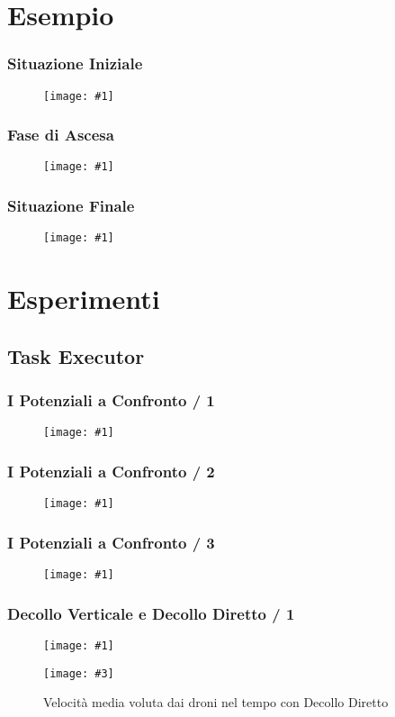 \documentclass{beamer}
\newcommand{\putimage}[2] {
  \begin{figure}[H]
    \centering
    \texttt{[image: \#1]}
	\end{figure}
}
\newcommand{\putimagecouple}[4] {
  \begin{figure}[!htb]
    \centering
    \begin{minipage}{0.45\linewidth}
      \centering
      \texttt{[image: \#1]}
      \caption{#2}
    \end{minipage}
    \hspace{0.25cm}
    \begin{minipage}{0.45\linewidth}
      \centering
      \texttt{[image: \#3]}
      \caption{#4}
    \end{minipage}
  \end{figure}
}
\begin{document}
\section{Esempio}

\begin{frame}
\frametitle{Situazione Iniziale}
\putimage{images/esempio/iterazione\_zero\_left.png}{0.85}
\end{frame}

\begin{frame}
\frametitle{Fase di Ascesa}
\putimage{images/esempio/iterazione\_venti\_left.png}{0.85}
\end{frame}

\begin{frame}
\frametitle{Situazione Finale}
\putimage{images/esempio/iterazione\_finale\_top.png}{0.85}
\end{frame}

\section{Esperimenti}

\subsection{Task Executor}

\begin{frame}
\frametitle{I Potenziali a Confronto / 1}
  \putimage{images/slides/task-executor-noiseless-vertical/MeanDistanceFromTarget.png}{0.66}
\end{frame}

\begin{frame}
\frametitle{I Potenziali a Confronto / 2}
\putimage{images/slides/task-executor-noiseless-vertical/MeanDistancesWithinSquadron.png}{0.66}
\end{frame}

\begin{frame}
\frametitle{I Potenziali a Confronto / 3}
\putimage{images/slides/task-executor-noiseless-vertical/MinDistancesGlobally.png}{0.66}
\end{frame}

\begin{frame}
\frametitle{Decollo Verticale e Decollo Diretto / 1}
\putimagecouple{images/slides/task-executor-noiseless-vertical/MeanSpeed.png}{Velocit\`a media voluta dai droni nel tempo con Decollo Verticale}
               {images/slides/task-executor-noiseless-direct/MeanSpeed.png}{Velocit\`a media voluta dai droni nel tempo con Decollo Diretto}
\end{frame}
\end{document}
